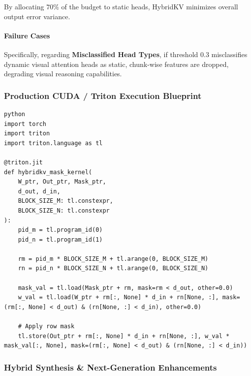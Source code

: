 By allocating $70\%$ of the budget to static heads, HybridKV minimizes overall output error variance.

\paragraph{Failure Cases}

Specifically, regarding \textbf{Misclassified Head Types}, if threshold $0.3$ misclassifies dynamic visual attention heads as static, chunk-wise features are dropped, degrading visual reasoning capabilities.



\subsubsection*{Production CUDA / Triton Execution Blueprint}

\vspace{0.5em}
\begin{mdframed}[backgroundcolor=codebg, linecolor=codeframe, linewidth=1pt, roundcorner=4pt, innerleftmargin=2pt, innerrightmargin=5pt, innertopmargin=5pt, innerbottommargin=5pt]
\begin{lstlisting}
python
import torch
import triton
import triton.language as tl

@triton.jit
def hybridkv_mask_kernel(
    W_ptr, Out_ptr, Mask_ptr,
    d_out, d_in,
    BLOCK_SIZE_M: tl.constexpr,
    BLOCK_SIZE_N: tl.constexpr
):
    pid_m = tl.program_id(0)
    pid_n = tl.program_id(1)

    rm = pid_m * BLOCK_SIZE_M + tl.arange(0, BLOCK_SIZE_M)
    rn = pid_n * BLOCK_SIZE_N + tl.arange(0, BLOCK_SIZE_N)

    mask_val = tl.load(Mask_ptr + rm, mask=rm < d_out, other=0.0)
    w_val = tl.load(W_ptr + rm[:, None] * d_in + rn[None, :], mask=(rm[:, None] < d_out) & (rn[None, :] < d_in), other=0.0)

    # Apply row mask
    tl.store(Out_ptr + rm[:, None] * d_in + rn[None, :], w_val * mask_val[:, None], mask=(rm[:, None] < d_out) & (rn[None, :] < d_in))
\end{lstlisting}
\end{mdframed}
\vspace{0.5em}


\subsubsection*{Hybrid Synthesis \& Next-Generation Enhancements}

